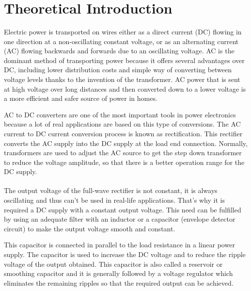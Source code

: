 \section{Theoretical Introduction}
\label{sec:theoretical}

\paragraph{}
Electric power is transported on wires either as a direct current (DC) flowing in one direction at a non-oscillating constant voltage, or as an alternating current (AC) flowing backwards and forwards due to an oscillating voltage. AC is the dominant method of transporting power because it offers several advantages over DC, including lower distribution costs and simple way of converting between voltage levels thanks to the invention of the transformer. AC power that is sent at high voltage over long distances and then converted down to a lower voltage is a more efficient and safer source of power in homes. 

AC to DC converters are one of the most important tools in power electronics because a lot of real applications are based on this type of conversions. The AC current to DC current conversion process is known as rectification. This rectifier converts the  AC supply into the DC supply at the  load end connection. Normally, transformers are used to adjust the AC source to get the step down transformer to reduce the voltage amplitude, so that there is a better operation range for the DC supply.

\paragraph{}
The output voltage of the full-wave rectifier is not constant, it is always oscillating and thus can’t be used in real-life applications. That's why it is required a DC supply with a constant output voltage. This need can be fulfilled by using an adequate filter with an inductor or a capacitor (envelope detector circuit) to make the output voltage smooth and constant.

This capacitor is connected in parallel to the load resistance in a linear power supply. The capacitor is used to increase the DC voltage and to reduce the ripple voltage of the output obtained. This capacitor is also called a reservoir or smoothing capacitor and it is generally followed by a voltage regulator which eliminates the remaining ripples so that the required output can be achieved.

